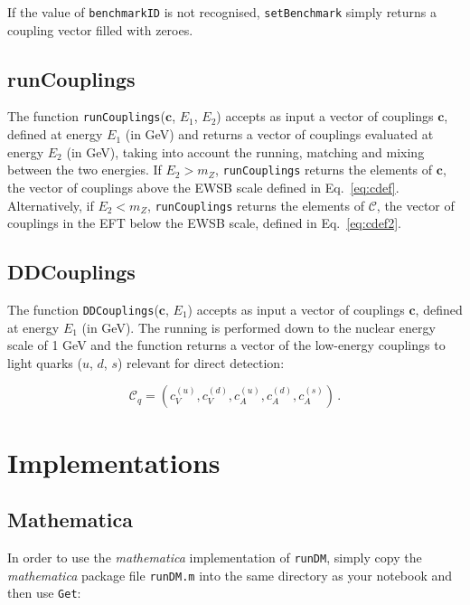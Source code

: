 \documentclass[notitlepage,12pt]{article}
\begin{document}
If the value of \texttt{benchmarkID} is not recognised, \texttt{setBenchmark} simply returns a coupling vector filled with zeroes.

\subsection{runCouplings}

The function \texttt{runCouplings}($\mathbf{c}$, $E_1$, $E_2$) accepts as input a vector of couplings $\mathbf{c}$, defined at energy $E_1$ (in GeV) and returns a vector of couplings evaluated at energy $E_2$ (in GeV), taking into account the running, matching and mixing between the two energies. If $E_2 > m_Z$, \texttt{runCouplings} returns the elements of $\mathbf{c}$, the vector of couplings above the EWSB scale defined in Eq.~\ref{eq:cdef}. Alternatively, if $E_2 < m_Z$, \texttt{runCouplings} returns the elements of $\mathbf{\mathcal{C}}$, the vector of couplings in the EFT below the EWSB scale, defined in Eq.~\ref{eq:cdef2}.

\subsection{DDCouplings}

The function \texttt{DDCouplings}($\mathbf{c}$, $E_1$) accepts as input a vector of couplings $\mathbf{c}$, defined at energy $E_1$ (in GeV). The running is performed down to the nuclear energy scale of 1 GeV and the function returns a vector of the low-energy couplings to light quarks ($u$, $d$, $s$) relevant for direct detection:

\begin{equation}
\mathcal{C}_q = \left( c_V^{(u)}, c_V^{(d)}, c_A^{(u)}, c_A^{(d)}, c_A^{(s)} \right)\,.
\end{equation}


\section{Implementations}
\label{sec:implementations}

\subsection{Mathematica}

In order to use the \textit{mathematica} implementation of \texttt{runDM}, simply copy the \textit{mathematica} package file \texttt{runDM.m} into the same directory as your notebook and then use \texttt{Get}:
\end{document}
